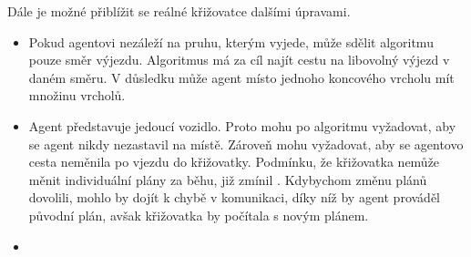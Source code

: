 Dále je možné přiblížit se reálné křižovatce dalšími úpravami.
\begin{itemize}
	\item Pokud agentovi nezáleží na pruhu, kterým vyjede, může sdělit algoritmu pouze směr výjezdu.
	Algoritmus má za cíl najít cestu na libovolný výjezd v daném směru.
	V důsledku může agent místo jednoho koncového vrcholu mít množinu vrcholů.
	\item Agent představuje jedoucí vozidlo.
	Proto mohu po algoritmu vyžadovat, aby se agent nikdy nezastavil na místě.
	Zároveň mohu vyžadovat, aby se agentovo cesta neměnila po vjezdu do křižovatky.
	Podmínku, že křižovatka nemůže měnit individuální plány za běhu, již zmínil \citet{Dresner}.
	Kdybychom změnu plánů dovolili, mohlo by dojít k chybě v komunikaci, díky níž by agent prováděl původní plán,
	avšak křižovatka by počítala s novým plánem.
	\item %
\end{itemize}
